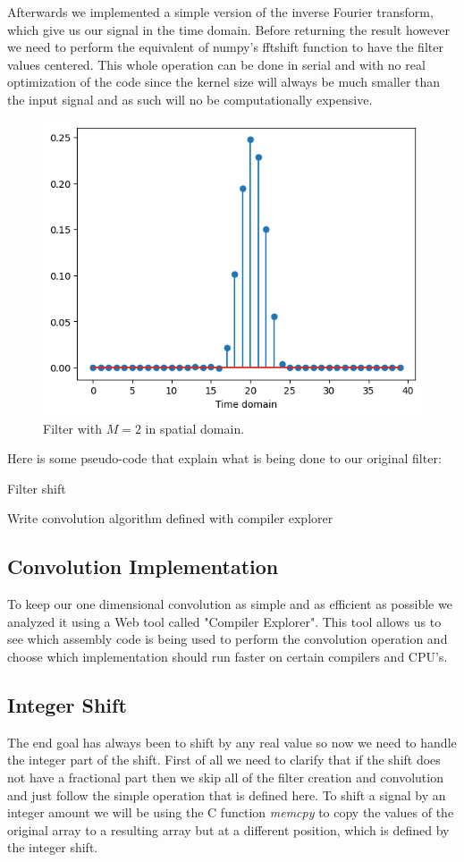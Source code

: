 \documentclass[]{usiinfbachelorproject}
\begin{document}
		 Afterwards we implemented a simple version of the inverse Fourier transform, which give us our signal in the time domain. Before returning the result however we need to perform the equivalent of numpy's fftshift function to have the filter values centered. This whole operation can be done in serial and with no real optimization of the code since the kernel size will always be much smaller than the input signal and as such will no be computationally expensive.
		 \begin{figure}[h]
		 	\centering
		 	\includegraphics[width=0.4\columnwidth]{images/ifft_filter_m_2_25_shift.png}
		 	\caption{Filter with $M=2$ in spatial domain.}
		 	\label{final_filter}
		 \end{figure}
		 
		 
		
		Here is some pseudo-code that explain what is being done to our original filter:
		\begin{algorithm}
			\caption{Filter shift}\label{alg:cap}
			Write convolution algorithm defined with compiler explorer
		\end{algorithm}
		
		
		\subsection{Convolution Implementation}
		To keep our one dimensional convolution as simple and as efficient as possible we analyzed it using a Web tool called "Compiler Explorer"\cite{godbolt}. This tool allows us to see which assembly code is being used to perform the convolution operation and choose which implementation should run faster on certain compilers and CPU's.
		
		
		
		\subsection{Integer Shift}
		The end goal has always been to shift by any real value so now we need to handle the integer part of the shift. First of all we need to clarify that if the shift does not have a fractional part then we skip all of the filter creation and convolution and just follow the simple operation that is defined here.
		To shift a signal by an integer amount we will be using the C function \textsl{memcpy} to copy the values of the original array to a resulting array but at a different position, which is defined by the integer shift.
		
\end{document}
